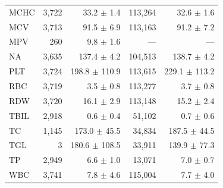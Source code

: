 \begin{table}[ht]
\begin{tabular}{lrrrr}
MCHC & 3,722 & 33.2 $\pm$ 1.4 & 113,264 & 32.6 $\pm$ 1.6 \\
MCV & 3,713 & 91.5 $\pm$ 6.9 & 113,163 & 91.2 $\pm$ 7.2 \\
MPV & 260 & 9.8 $\pm$ 1.6 & --- & --- \\
NA & 3,635 & 137.4 $\pm$ 4.2 & 104,513 & 138.7 $\pm$ 4.2 \\
PLT & 3,724 & 198.8 $\pm$ 110.9 & 113,615 & 229.1 $\pm$ 113.2 \\
RBC & 3,719 & 3.5 $\pm$ 0.8 & 113,277 & 3.7 $\pm$ 0.8 \\
RDW & 3,720 & 16.1 $\pm$ 2.9 & 113,148 & 15.2 $\pm$ 2.4 \\
TBIL & 2,918 & 0.6 $\pm$ 0.4 & 51,102 & 0.7 $\pm$ 0.6 \\
TC & 1,145 & 173.0 $\pm$ 45.5 & 34,834 & 187.5 $\pm$ 44.5 \\
TGL & 3 & 180.6 $\pm$ 108.5 & 33,911 & 139.9 $\pm$ 77.3 \\
TP & 2,949 & 6.6 $\pm$ 1.0 & 13,071 & 7.0 $\pm$ 0.7 \\
WBC & 3,741 & 7.8 $\pm$ 4.6 & 115,004 & 7.7 $\pm$ 4.0 \\
\bottomrule
\end{tabular}
\label{tab:03_cohort_train}
\end{table}